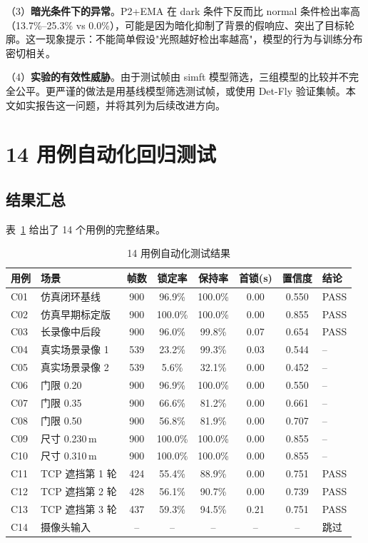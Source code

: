 （3）\textbf{暗光条件下的异常}。P2+EMA 在 dark 条件下反而比 normal 条件检出率高（13.7\%--25.3\% vs 0.0\%），可能是因为暗化抑制了背景的假响应、突出了目标轮廓。这一现象提示：不能简单假设"光照越好检出率越高"，模型的行为与训练分布密切相关。

（4）\textbf{实验的有效性威胁}。由于测试帧由 simft 模型筛选，三组模型的比较并不完全公平。更严谨的做法是用基线模型筛选测试帧，或使用 Det-Fly 验证集帧。本文如实报告这一问题，并将其列为后续改进方向。

\section{14 用例自动化回归测试}

\subsection{结果汇总}

表~\ref{tab:test14} 给出了 14 个用例的完整结果。

\begin{table}[htbp]
\centering
\caption{14 用例自动化测试结果}
\label{tab:test14}
\small
\begin{tabular}{llcccccl}
\toprule
\textbf{用例} & \textbf{场景} & \textbf{帧数} & \textbf{锁定率} & \textbf{保持率} & \textbf{首锁(s)} & \textbf{置信度} & \textbf{结论} \\
\midrule
C01 & 仿真闭环基线 & 900 & 96.9\% & 100.0\% & 0.00 & 0.550 & PASS \\
C02 & 仿真早期标定版 & 900 & 100.0\% & 100.0\% & 0.00 & 0.855 & PASS \\
C03 & 长录像中后段 & 900 & 96.0\% & 99.8\% & 0.07 & 0.654 & PASS \\
C04 & 真实场景录像 1 & 539 & 23.2\% & 99.3\% & 0.03 & 0.544 & -- \\
C05 & 真实场景录像 2 & 539 & 5.6\% & 32.1\% & 0.00 & 0.452 & -- \\
C06 & 门限 0.20 & 900 & 96.9\% & 100.0\% & 0.00 & 0.550 & -- \\
C07 & 门限 0.35 & 900 & 66.6\% & 81.2\% & 0.00 & 0.661 & -- \\
C08 & 门限 0.50 & 900 & 56.8\% & 81.9\% & 0.00 & 0.707 & -- \\
C09 & 尺寸 0.230\,m & 900 & 100.0\% & 100.0\% & 0.00 & 0.855 & -- \\
C10 & 尺寸 0.310\,m & 900 & 100.0\% & 100.0\% & 0.00 & 0.855 & -- \\
C11 & TCP 遮挡第 1 轮 & 424 & 55.4\% & 88.9\% & 0.00 & 0.751 & PASS \\
C12 & TCP 遮挡第 2 轮 & 428 & 56.1\% & 90.7\% & 0.00 & 0.739 & PASS \\
C13 & TCP 遮挡第 3 轮 & 437 & 59.3\% & 94.5\% & 0.21 & 0.751 & PASS \\
C14 & 摄像头输入 & -- & -- & -- & -- & -- & 跳过 \\
\bottomrule
\end{tabular}
\end{table}


